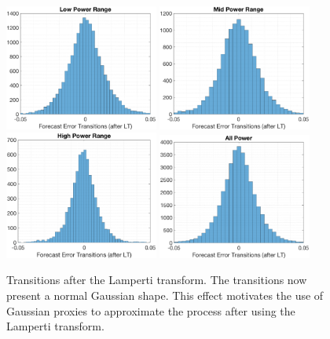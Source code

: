 \documentclass[11pt]{article}
\theoremstyle{definition}
\begin{document}
\begin{figure}[H]
\centering
\includegraphics[width=0.45\textwidth]{plots/LP_t_LP.eps}
\includegraphics[width=0.45\textwidth]{plots/MP_t_LP.eps}\\
\includegraphics[width=0.45\textwidth]{plots/HP_t_LP.eps}
\includegraphics[width=0.45\textwidth]{plots/AP_t_LP.eps}
\caption{Transitions after the Lamperti transform. The transitions now present a normal Gaussian shape. This effect motivates the use of Gaussian proxies to approximate the process after using the Lamperti transform.}
  \label{fig:LP_transitions}
\end{figure}
\end{document}
